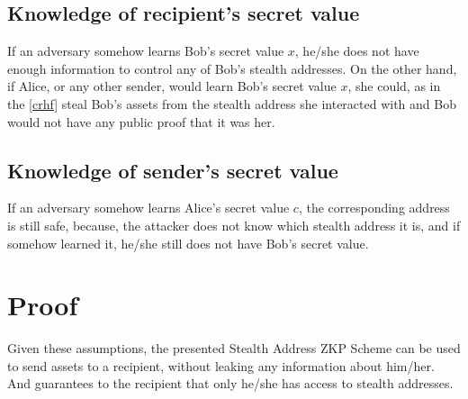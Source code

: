 \subsection{Knowledge of recipient's secret value}

If an adversary somehow learns Bob's secret value $x$, he/she does not have enough
information to control any of Bob's stealth addresses. On the other hand, if Alice,
or any other sender, would learn Bob's secret value $x$, she could, as in the
\ref{crhf} steal Bob's assets from the stealth address she interacted with and
Bob would not have any public proof that it was her.

\subsection{Knowledge of sender's secret value}

If an adversary somehow learns Alice's secret value $c$, the corresponding
address is still safe, because, the attacker does not know which stealth address
it is, and if somehow learned it, he/she still does not have Bob's secret value.

\section{Proof}

Given these assumptions, the presented Stealth Address ZKP Scheme can be used to
send assets to a recipient, without leaking any information about him/her. And
guarantees to the recipient that only he/she has access to stealth addresses.

